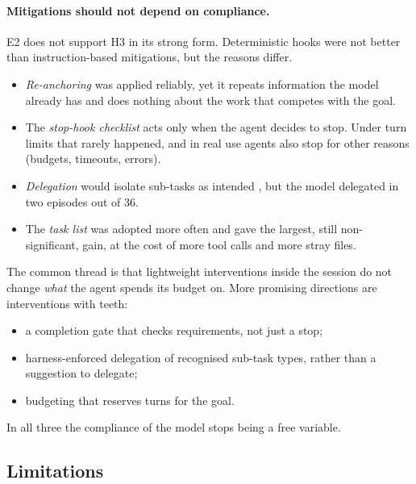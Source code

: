 \paragraph{Mitigations should not depend on compliance.} E2 does not support H3 in its strong form.
Deterministic hooks were not better than instruction-based mitigations, but the reasons differ.
\begin{itemize}
  \item \emph{Re-anchoring} was applied reliably, yet it repeats information the model already has
        and does nothing about the work that competes with the goal.
  \item The \emph{stop-hook checklist} acts only when the agent decides to stop. Under turn limits
        that rarely happened, and in real use agents also stop for other reasons (budgets,
        timeouts, errors).
  \item \emph{Delegation} would isolate sub-tasks as intended \citep{fei2026codedelegator}, but the
        model delegated in two episodes out of 36.
  \item The \emph{task list} was adopted more often and gave the largest, still non-significant,
        gain, at the cost of more tool calls and more stray files.
\end{itemize}
The common thread is that lightweight interventions inside the session do not change \emph{what}
the agent spends its budget on. More promising directions are interventions with teeth:
\begin{itemize}
  \item a completion gate that checks requirements, not just a stop;
  \item harness-enforced delegation of recognised sub-task types, rather than a suggestion to
        delegate;
  \item budgeting that reserves turns for the goal.
\end{itemize}
In all three the compliance of the model stops being a free variable.

\subsection{Limitations}

